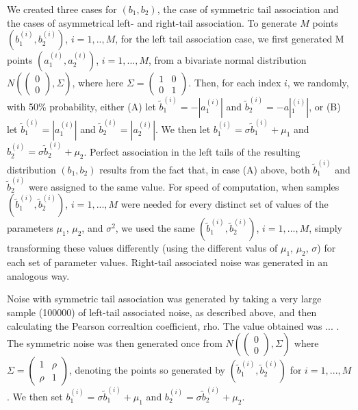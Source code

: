 \documentclass[letterpaper,11pt]{article}
\begin{document}
We created three cases for $(b_1,b_2)$, the case of symmetric tail association and the cases of asymmetrical left- and right-tail association. To generate $M$ points $(b_1^{(i)}, b_2^{(i)})$, $i=1,..,M$, for the left tail association case, we first generated M points $(a_1^{(i)},a_2^{(i)})$, $i=1,...,M$, from a bivariate normal distribution $N(\begin{pmatrix} 0\\0\end{pmatrix}, \Sigma)$, where here $\Sigma = \begin{pmatrix} 1&0\\0&1\end{pmatrix}$. Then, for each index $i$, we randomly, with 50\% probability, either (A) let $\tilde b_1^{(i)} = -|a_1^{(i)}|$ and $\tilde b_2^{(i)} = -a|_1^{(i)}|$, or (B) let $\tilde b_1^{(i)} = |a_1^{(i)}|$ and $\tilde b_2^{(i)} = |a_2^{(i)}|$. We then let $b_1^{(i)} = \sigma \tilde b_1^{(i)} + \mu_1$ and $b_2^{(i)} = \sigma \tilde b_2^{(i)} + \mu_2$. Perfect association in the left tails of the resulting distribution $(b_1,b_2)$ results from the fact that, in case (A) above, both $\tilde b_1^{(i)}$ and $\tilde b_2^{(i)}$ were assigned to the same value. For speed of computation, when samples $(\tilde b_1^{(i)},\tilde b_2^{(i)})$, $i=1,...,M$ were needed for every distinct set of values of the parameters $\mu_1$, $\mu_2$, and $\sigma^2$, we used the same $(\tilde b_1^{(i)},\tilde b_2^{(i)})$, $i=1,...,M$, simply transforming these values differently (using the different valus of $\mu_1$, $\mu_2$, $\sigma$) for each set of parameter values. Right-tail associated noise was generated in an analogous way. 

Noise with symmetric tail association was generated by taking a very large sample (100000) of left-tail associated noise, as described above, and then calculating the Pearson correaltion coefficient, rho. The value obtained was ... . The symmetric noise was then generated once from $N(\begin{pmatrix} 0\\0\end{pmatrix}, \Sigma)$ where $\Sigma = \begin{pmatrix} 1&\rho \\ \rho&1\end{pmatrix}$, denoting the points so generated by $(\tilde b_1^{(i)},\tilde b_2^{(i)})$ for $i=1,...,M$. We then set $b_1^{(i)} = \sigma \tilde b_1^{(i)} + \mu_1$ and $b_2^{(i)} = \sigma \tilde b_2^{(i)}+ \mu_2$.
\end{document}
